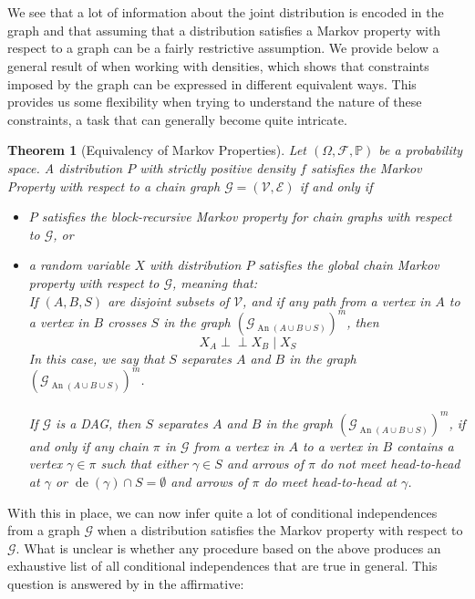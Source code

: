 \documentclass[11pt, a4paper]{memoir}
\theoremstyle{break}
\newtheorem{thm}{Theorem}
\theoremstyle{break}
\theoremstyle{nonumberplain}
\newcommand{\mP}{\mathbb{P}}
\newcommand{\indep}{\perp \!\!\! \perp}
\DeclareMathOperator{\de}{de}
\DeclareMathOperator{\an}{An}
\begin{document}
\\\\
We see that a lot of information about the joint distribution is encoded in the graph and that assuming that a distribution satisfies a Markov property with respect to a graph can be a fairly restrictive assumption. We provide below a general result of \cite{Steffen} when working with densities, which shows that constraints imposed by the graph can be expressed in different equivalent ways. This provides us some flexibility when trying to understand the nature of these constraints, a task that can generally become quite intricate.
\begin{thm}[Equivalency of Markov Properties]\label{equiv}
Let $(\Omega, \mathcal{F}, \mP)$ be a probability space. A distribution $P$ with strictly positive density $f$ satisfies the Markov Property with respect to a chain graph $\mathcal{G}=(\mathcal{V},\mathcal{E})$ if and only if
\begin{itemize}
	\item $P$ satisfies the block-recursive Markov property for chain graphs with respect to $\mathcal{G}$, or
	\item a random variable $X$ with distribution $P$ satisfies the \emph{global chain Markov property} with respect to $\mathcal{G}$, meaning that:\\ If $(A,B,S)$ are disjoint subsets of $\mathcal{V}$, and if any path from a vertex in $A$ to a vertex in $B$ crosses $S$ in the graph $\left(\mathcal{G}_{\an(A\cup B\cup S)}\right)^m$, then
	$$X_A\indep X_B\mid X_S$$
	In this case, we say that $S$ separates $A$ and $B$ in the graph $\left(\mathcal{G}_{\an(A\cup B\cup S)}\right)^m$.\\\\
	If $\mathcal{G}$ is a DAG, then $S$ separates $A$ and $B$ in the graph $\left(\mathcal{G}_{\an(A\cup B\cup S)}\right)^m$, if and only if any chain $\pi$ in $\mathcal{G}$ from a vertex in $A$ to a vertex in $B$ contains a vertex $\gamma\in \pi$ such that either $\gamma\in S$ and arrows of $\pi$ do not meet head-to-head at $\gamma$ or $\de(\gamma)\cap S=\emptyset$ and arrows of $\pi$ do meet head-to-head at $\gamma$. 
\end{itemize}
\end{thm}
With this in place, we can now infer quite a lot of conditional independences from a graph $\mathcal{G}$ when a distribution satisfies the Markov property with respect to $\mathcal{G}$. What is unclear is whether any procedure based on the above produces an exhaustive list of all conditional independences that are true in general. This question is answered by \cite{Remco} in the affirmative:
\end{document}
